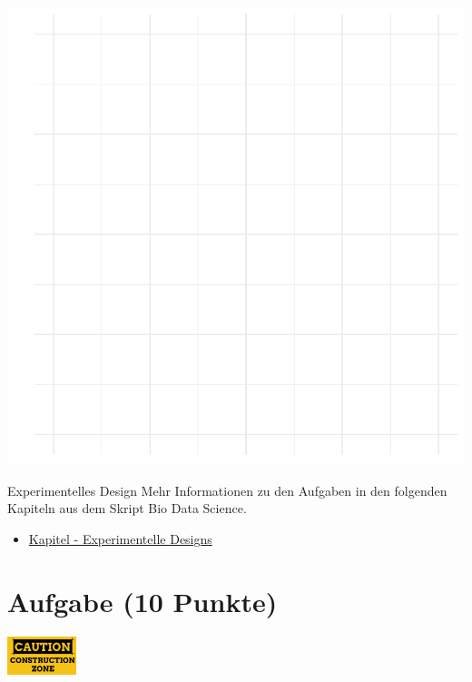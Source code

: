 \documentclass[a4paper, 9pt]{scrartcl}\usepackage[]{graphicx}\usepackage[]{xcolor}
\makeatletter
\def\maxwidth{ %
  \ifdim\Gin@nat@width>\linewidth
    \linewidth
  \else
    \Gin@nat@width
  \fi
}
\makeatother
\begin{document}
{\centering \includegraphics[width=\maxwidth]{img/modeling-R-01-1} 

}


 
\clearpage
\begin{graybox}{Experimentelles Design}
Mehr Informationen zu den Aufgaben in den folgenden Kapiteln aus dem Skript Bio Data Science.
  \begin{itemize}
  \item \href{https://jkruppa.github.io/experimental-design-preface.html}{Kapitel - Experimentelle Designs}
  \end{itemize}  
\end{graybox}
\clearpage

\section{Aufgabe \hfill (10 Punkte)}

\hfill\href{}{\includegraphics[width =
  2cm]{img/caution}}\\[1Ex]
\end{document}
